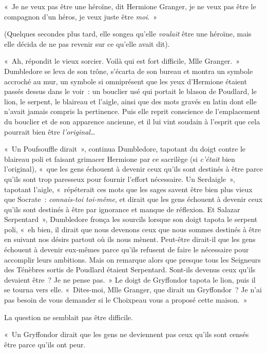 «~Je ne veux pas être une héroïne, dit Hermione Granger, je ne veux pas être le compagnon d'un héros, je veux juste être \emph{moi}.~»

(Quelques secondes plus tard, elle songea qu'elle \emph{voulait} être une héroïne, mais elle décida de ne pas revenir sur ce qu'elle avait dit).

«~Ah, répondit le vieux sorcier. Voilà qui est fort difficile, Mlle Granger.~» Dumbledore se leva de son trône, s'écarta de son bureau et montra un symbole accroché au mur, un symbole si omniprésent que les yeux d'Hermione étaient passés dessus dans le voir~: un bouclier usé qui portait le blason de Poudlard, le lion, le serpent, le blaireau et l'aigle, ainsi que des mots gravés en latin dont elle n'avait jamais compris la pertinence. Puis elle reprit conscience de l'emplacement du bouclier et de son apparence ancienne, et il lui vint soudain à l'esprit que cela pourrait bien être \emph{l'original}…

«~Un Poufsouffle dirait~», continua Dumbledore, tapotant du doigt contre le blaireau poli et faisant grimacer Hermione par ce sacrilège (si \emph{c'était} bien l'original), «~que les gens échouent à devenir ceux qu'ils sont destinés à être parce qu'ils sont trop paresseux pour fournir l'effort nécessaire. Un Serdaigle~», tapotant l'aigle, «~répéterait ces mots que les sages savent être bien plus vieux que Socrate~: \emph{connais-toi toi-même}, et dirait que les gens échouent à devenir ceux qu'ils sont destinés à être par ignorance et manque de réflexion. Et Salazar Serpentard~», Dumbledore fronça les sourcils lorsque son doigt tapota le serpent poli, «~eh bien, il dirait que nous devenons ceux que nous sommes destinés à être en suivant nos désirs partout où ils nous mènent. Peut-être dirait-il que les gens échouent à devenir eux-mêmes parce qu'ils refusent de faire le nécessaire pour accomplir leurs ambitions. Mais on remarque alors que presque tous les Seigneurs des Ténèbres sortis de Poudlard étaient Serpentard. Sont-ils devenus ceux qu'ils devaient être~? Je ne pense pas.~» Le doigt de Gryffondor tapota le lion, puis il se tourna vers elle. «~Dites-moi, Mlle Granger, que dirait un Gryffondor~? Je n'ai pas besoin de vous demander si le Choixpeau vous a proposé cette maison.~»

La question ne semblait pas être difficile.

«~Un Gryffondor dirait que les gens ne deviennent pas ceux qu'ils sont censés être parce qu'ils ont peur.

